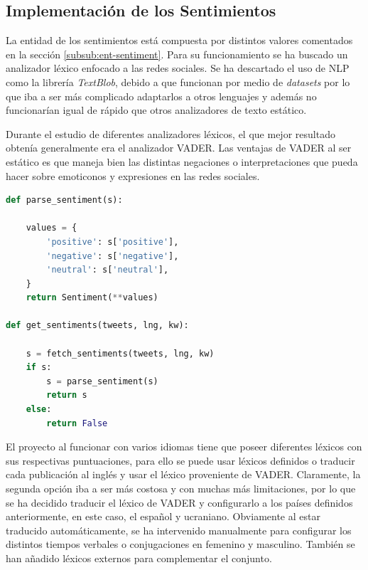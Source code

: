 \subsection{Implementación de los Sentimientos}
La entidad de los sentimientos está compuesta por distintos valores comentados en la sección \ref{subsub:ent-sentiment}. Para su funcionamiento se ha buscado un analizador léxico enfocado a las redes sociales. Se ha descartado el uso de \ac{NLP} como la librería \textit{TextBlob}, debido a que funcionan por medio de \textit{datasets} por lo que iba a ser más complicado adaptarlos a otros lenguajes y además no funcionarían igual de rápido que otros analizadores de texto estático.

\vspace{0.3cm}

Durante el estudio de diferentes analizadores léxicos, el que mejor resultado obtenía generalmente era el analizador \ac{VADER}. Las ventajas de \ac{VADER} al ser estático es que maneja bien las distintas negaciones o interpretaciones que pueda hacer sobre emoticonos y expresiones en las redes sociales. \cite{TowardsAI-vader}

\vspace{0.3cm}

\begin{lstlisting}[caption=Estructuración de los sentimientos,          label={lst:listing-python},language=Python]
def parse_sentiment(s):

    values = {
        'positive': s['positive'],
        'negative': s['negative'],
        'neutral': s['neutral'],
    }
    return Sentiment(**values)
    
def get_sentiments(tweets, lng, kw):

    s = fetch_sentiments(tweets, lng, kw)
    if s:
        s = parse_sentiment(s)
        return s
    else:
        return False
\end{lstlisting}

\vspace{0.3cm}

El proyecto al funcionar con varios idiomas tiene que poseer diferentes léxicos con sus respectivas puntuaciones, para ello se puede usar léxicos definidos o traducir cada publicación al inglés y usar el léxico proveniente de \ac{VADER}. Claramente, la segunda opción iba a ser más costosa y con muchas más limitaciones, por lo que se ha decidido traducir el léxico de \ac{VADER} y configurarlo a los países definidos anteriormente, en este caso, el español y ucraniano. Obviamente al estar traducido automáticamente, se ha intervenido manualmente para configurar los distintos tiempos verbales o conjugaciones en femenino y masculino. También se han añadido léxicos externos para complementar el conjunto.

